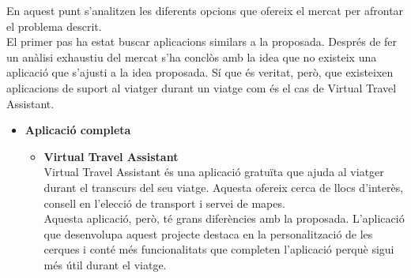 En aquest punt s'analitzen les diferents opcions que ofereix el mercat per afrontar el problema descrit.\\
El primer pas ha estat buscar aplicacions similars a la proposada. Després de fer un anàlisi exhaustiu del mercat s'ha conclòs amb la idea que no existeix una aplicació que s'ajusti a la idea proposada. Sí que és veritat, però, que existeixen aplicacions de suport al viatger durant un viatge com és el cas de Virtual Travel Assistant.
\begin{itemize}
\item{\textbf{Aplicació completa}}
\begin{itemize}
\item{\textbf{Virtual Travel Assistant\\}}
Virtual Travel Assistant és una aplicació gratuïta que ajuda al viatger durant el transcurs del seu viatge. Aquesta ofereix cerca de llocs d'interès, consell en l'elecció de transport i servei de mapes.\\
Aquesta aplicació, però, té grans diferències amb la proposada. L'aplicació que desenvolupa aquest projecte destaca en la personalització de les cerques i conté més funcionalitats que completen l'aplicació perquè sigui més útil durant el viatge.\\
\end{itemize}


\end{itemize}
